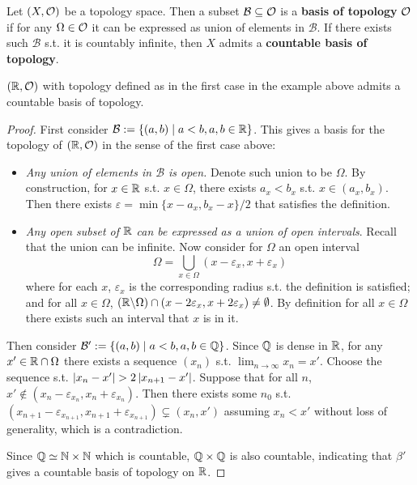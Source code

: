 \documentclass{article}
\begin{document}
\begin{definition}
    Let $(X, \mathcal{O})$ be a topology space. Then a subset $\mathcal{B} \subseteq \mathcal{O}$ is a \textbf{basis of topology} $\mathcal{O}$ if for any $\Omega \in \mathcal{O}$ it can be expressed as union of elements in $\mathcal{B}$. If there exists such $\mathcal{B}$ s.t. it is countably infinite, then $X$ admits a \textbf{countable basis of topology}.
\end{definition}

\begin{proposition}
    $(\mathbb{R}, \mathcal{O})$ with topology defined as in the first case in the example above admits a countable basis of topology.
\end{proposition}

\begin{proof}
    First consider $\mathcal{B} := \{(a, b) \mid a < b, a, b \in \mathbb{R}\}$. This gives a basis for the topology of $(\mathbb{R}, \mathcal{O})$ in the sense of the first case above:
    \begin{itemize}
        \item \emph{Any union of elements in $\mathcal{B}$ is open.} Denote such union to be $\Omega$. By construction, for $x \in \mathbb{R}$ s.t. $x \in \Omega$, there exists $a_x < b_x$ s.t. $x \in (a_x, b_x)$. Then there exists $\varepsilon = \min\{x - a_x, b_x - x\} / 2$ that satisfies the definition.
        \item \emph{Any open subset of $\mathbb{R}$ can be expressed as a union of open intervals}. Recall that the union can be infinite. Now consider for $\Omega$ an open interval
        \[
            \Omega = \bigcup_{x \in \Omega} (x - \varepsilon_x, x + \varepsilon_x)
        \]
        where for each $x$, $\varepsilon_x$ is the corresponding radius s.t. the definition is satisfied; and for all $x \in \Omega$, $(\mathbb{R} \backslash \Omega) \cap (x - 2\varepsilon_x, x + 2\varepsilon_x) \neq \emptyset$. By definition for all $x \in \Omega$ there exists such an interval that $x$ is in it.
    \end{itemize}
    Then consider $\mathcal{B}' := \{(a, b) \mid a < b, a, b \in \mathbb{Q}\}$. Since $\mathbb{Q}$ is dense in $\mathbb{R}$, for any $x' \in \mathbb{R} \cap \Omega$ there exists a sequence $(x_n)$ s.t. $\lim_{n \to \infty} x_n = x'$. Choose the sequence s.t. $\left|x_n - x'\right| > 2\left|x_{n+1} - x'\right|$. Suppose that for all $n$, $x' \notin (x_n - \varepsilon_{x_n}, x_n + \varepsilon_{x_n})$. Then there exists some $n_0$ s.t. $(x_{n+1} - \varepsilon_{x_{n+1}}, x_{n+1} + \varepsilon_{x_{n+1}}) \subsetneq (x_n, x')$ assuming $x_n < x'$ without loss of generality, which is a contradiction.

    Since $\mathbb{Q} \simeq \mathbb{N} \times \mathbb{N}$ which is countable, $\mathbb{Q} \times \mathbb{Q}$ is also countable, indicating that $\beta'$ gives a countable basis of topology on $\mathbb{R}$.
\end{proof}
\end{document}
